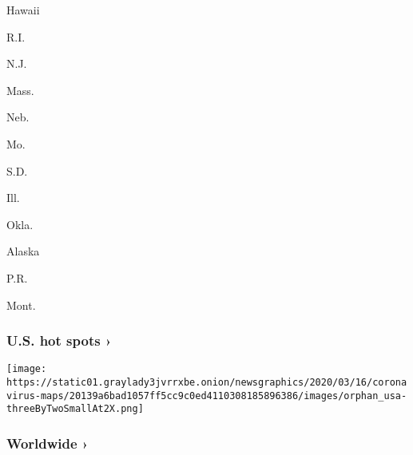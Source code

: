 \href{https://www.nytimes3xbfgragh.onion/interactive/2020/us/hawaii-coronavirus-cases.html}{}

Hawaii
\href{https://www.nytimes3xbfgragh.onion/interactive/2020/us/rhode-island-coronavirus-cases.html}{}

R.I.
\href{https://www.nytimes3xbfgragh.onion/interactive/2020/us/new-jersey-coronavirus-cases.html}{}

N.J.
\href{https://www.nytimes3xbfgragh.onion/interactive/2020/us/massachusetts-coronavirus-cases.html}{}

Mass.
\href{https://www.nytimes3xbfgragh.onion/interactive/2020/us/nebraska-coronavirus-cases.html}{}

Neb.
\href{https://www.nytimes3xbfgragh.onion/interactive/2020/us/missouri-coronavirus-cases.html}{}

Mo.
\href{https://www.nytimes3xbfgragh.onion/interactive/2020/us/south-dakota-coronavirus-cases.html}{}

S.D.
\href{https://www.nytimes3xbfgragh.onion/interactive/2020/us/illinois-coronavirus-cases.html}{}

Ill.
\href{https://www.nytimes3xbfgragh.onion/interactive/2020/us/oklahoma-coronavirus-cases.html}{}

Okla.
\href{https://www.nytimes3xbfgragh.onion/interactive/2020/us/alaska-coronavirus-cases.html}{}

Alaska
\href{https://www.nytimes3xbfgragh.onion/interactive/2020/us/puerto-rico-coronavirus-cases.html}{}

P.R.
\href{https://www.nytimes3xbfgragh.onion/interactive/2020/us/montana-coronavirus-cases.html}{}

Mont.

\href{https://www.nytimes3xbfgragh.onion/interactive/2020/us/coronavirus-us-cases.html}{}

\hypertarget{us-hot-spots-}{%
\subsubsection{U.S. hot spots ›}\label{us-hot-spots-}}

\texttt{[image: https://static01.graylady3jvrrxbe.onion/newsgraphics/2020/03/16/coronavirus-maps/20139a6bad1057ff5cc9c0ed4110308185896386/images/orphan\_usa-threeByTwoSmallAt2X.png]}
\href{https://www.nytimes3xbfgragh.onion/interactive/2020/world/coronavirus-maps.html}{}

\hypertarget{worldwide-}{%
\subsubsection{Worldwide ›}\label{worldwide-}}

